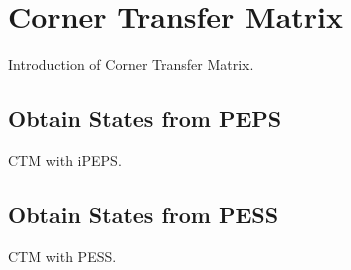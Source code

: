 \chapter{Corner Transfer Matrix}
\label{chapter:ctm}
Introduction of Corner Transfer Matrix.

\section{Obtain States from PEPS}
\label{2ditebdctm}
CTM with iPEPS.

\section{Obtain States from PESS}
\label{pessctm}
CTM with PESS.

